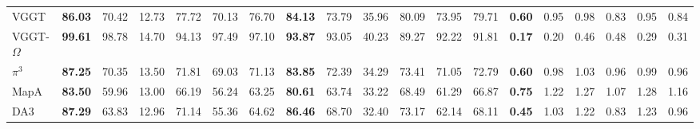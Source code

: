 \begin{table}[ht]
{\begin{tabular}{l cccccc cccccc cccccc}





VGGT & \textbf{86.03} & 70.42 & 12.73 & 77.72 & 70.13 & 76.70 & \textbf{84.13} & 73.79 & 35.96 & 80.09 & 73.95 & 79.71 & \textbf{0.60} & 0.95 & 0.98 & 0.83 & 0.95 & 0.84 \\

VGGT-$\Omega$ & \textbf{99.61} & 98.78 & 14.70 & 94.13 & 97.49 & 97.10 & \textbf{93.87} & 93.05 & 40.23 & 89.27 & 92.22 & 91.81 & \textbf{0.17} & 0.20 & 0.46 & 0.48 & 0.29 & 0.31 \\

$\pi^3$ & \textbf{87.25} & 70.35 & 13.50 & 71.81 & 69.03 & 71.13 & \textbf{83.85} & 72.39 & 34.29 & 73.41 & 71.05 & 72.79 & \textbf{0.60} & 0.98 & 1.03 & 0.96 & 0.99 & 0.96 \\

MapA & \textbf{83.50} & 59.96 & 13.00 & 66.19 & 56.24 & 63.25 & \textbf{80.61} & 63.74 & 33.22 & 68.49 & 61.29 & 66.87 & \textbf{0.75} & 1.22 & 1.27 & 1.07 & 1.28 & 1.16 \\

DA3 & \textbf{87.29} & 63.83 & 12.96 & 71.14 & 55.36 & 64.62 & \textbf{86.46} & 68.70 & 32.40 & 73.17 & 62.14 & 68.11 & \textbf{0.45} & 1.03 & 1.22 & 0.83 & 1.23 & 0.96 \\

\bottomrule

\end{tabular}%

}

\end{table}


